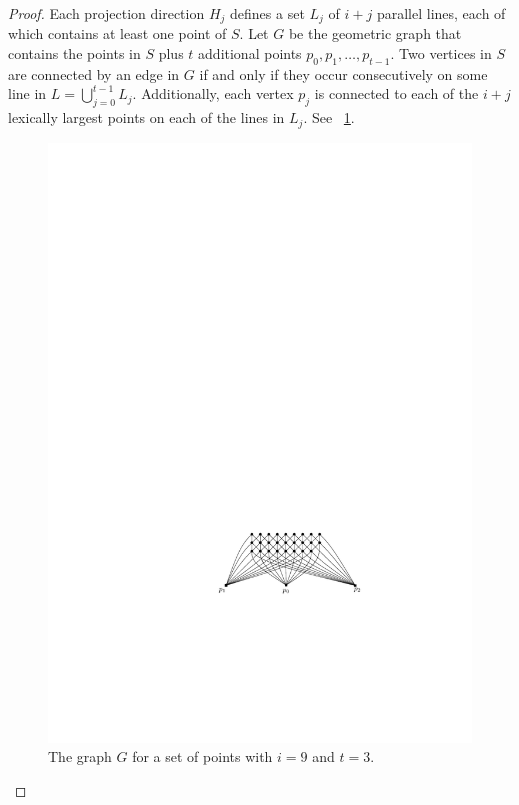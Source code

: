 \documentclass{ws-ijcga}
\begin{document}
\begin{proof}
Each projection direction $H_j$ defines a set $L_j$ of $i+j$ parallel
lines, each of which contains at least one point of $S$.  Let $G$ be
the geometric graph that contains the points in $S$ plus $t$ additional
points $p_0,p_1,\ldots,p_{t-1}$.  Two vertices in $S$ are connected by an
edge in $G$ if and only if they occur consecutively on some line in
$L=\bigcup_{j=0}^{t-1}L_j$.  Additionally, each vertex $p_j$ is connected
to each of the $i+j$ lexically largest points on each of the
lines in $L_j$.  See \figurename~\ref{fig:graph}.

\begin{figure}
  \begin{center}
    \includegraphics{graph}
  \end{center}
  \caption{The graph $G$ for a set of points with $i=9$ and $t=3$.}
  \label{fig:graph}
\end{figure}


\end{proof}
\end{document}
